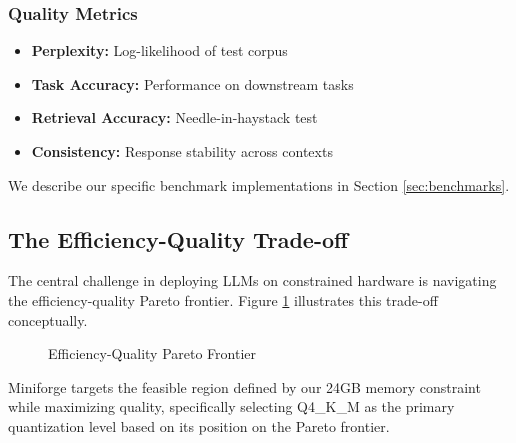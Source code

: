 \subsubsection{Quality Metrics}

\begin{itemize}
    \item \textbf{Perplexity:} Log-likelihood of test corpus
    \item \textbf{Task Accuracy:} Performance on downstream tasks
    \item \textbf{Retrieval Accuracy:} Needle-in-haystack test
    \item \textbf{Consistency:} Response stability across contexts
\end{itemize}

We describe our specific benchmark implementations in Section \ref{sec:benchmarks}.

\subsection{The Efficiency-Quality Trade-off}

The central challenge in deploying LLMs on constrained hardware is navigating the efficiency-quality Pareto frontier. Figure \ref{fig:pareto} illustrates this trade-off conceptually.

\begin{figure}[h]
\centering
{}
\caption{Efficiency-Quality Pareto Frontier}
\label{fig:pareto}
\end{figure}

Miniforge targets the feasible region defined by our 24GB memory constraint while maximizing quality, specifically selecting Q4\_K\_M as the primary quantization level based on its position on the Pareto frontier.
